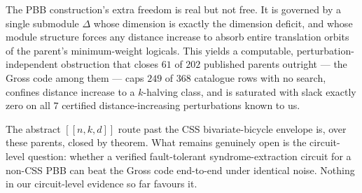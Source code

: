 \documentclass[11pt]{article}
\newcommand{\nk}[1]{[\![#1]\!]}
\theoremstyle{plain}
\theoremstyle{remark}
\begin{document}
The PBB construction's extra freedom is real but not free. It is governed by a single
submodule $\Delta$ whose dimension is exactly the dimension deficit, and whose module
structure forces any distance increase to absorb entire translation orbits of the
parent's minimum-weight logicals. This yields a computable, perturbation-independent
obstruction that closes $61$ of $202$ published parents outright --- the Gross code among
them --- caps $249$ of $368$ catalogue rows with no search, confines distance increase to a
$k$-halving class, and is saturated with slack exactly zero on all $7$ certified
distance-increasing perturbations known to us.

The abstract $\nk{n,k,d}$ route past the CSS bivariate-bicycle envelope is, over these
parents, closed by theorem. What remains genuinely open is the circuit-level question:
whether a verified fault-tolerant syndrome-extraction circuit for a non-CSS PBB can beat
the Gross code end-to-end under identical noise. Nothing in our circuit-level evidence so
far favours it.

\nocite{wei2026lowweight,webster2026distance}



\end{document}
